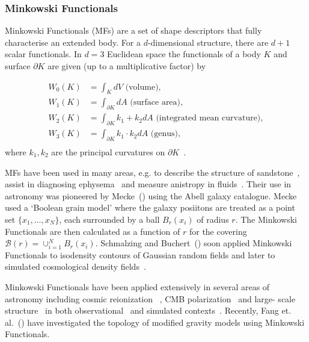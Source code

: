 \documentclass[a4paper,fleqn,usenatbib]{mnras}
\begin{document}
\subsubsection{Minkowski Functionals}

Minkowski Functionals (MFs) are a set of shape descriptors that fully characterise an extended body. For a $d$-dimensional structure, there are $d+1$ scalar functionals. In $d=3$ Euclidean space the functionals of a body $K$ and surface $\partial K$  are given (up to a multiplicative factor) by 

\begin{align}
W_0(K) &= \int_K dV \, \, \text{(volume)}, \\
W_1(K) &= \int_{\partial K} dA \, \, \text{(surface area)}, \\
W_2(K) &= \int_{\partial K} k_1 + k_2 dA \, \, \text{(integrated mean curvature)},\\
W_3(K) &= \int_{\partial K} k_1 \cdot k_2 dA \, \, \text{(genus)}, \\
\end{align}
where $k_1,k_2$ are the principal curvatures on $\partial K$~\citep{2013NJPh...15h3028S}.

MFs have been used in many areas, e.g. to describe the structure of sandstone~\citep{2002Hilfer}, assist in diagnosing ephysema~\citep{2012SPIE.8314E..4YL} and measure anistropy in fluids~\citep{2010JSMTE..11..010K}. Their use in astronomy was pioneered by Mecke~(\citeyear{1994A&A...288..697M}) using the Abell galaxy catalogue. Mecke used a `Boolean grain model' where the galaxy posiitons are treated as a point set $\{x_1,\dots,x_N\}$, each surrounded by a ball $B_r(x_i)$ of radius $r$. The Minkowski Functionals are then calculated as a function of $r$ for the covering $\mathscr{B}(r) = \cup^N_{i=1} B_r(x_i)$. Schmalzing and Buchert~(\citeyear{1997ApJ...482L...1S}) soon applied Minkowski Functionals to isodensity contours of Gaussian random fields and later to simulated cosmological density fields~\citep{1999ApJ...526..568S}.

Minkowski Functionals have been applied extensively in several areas of astronomy including cosmic reionization~ \citep{2006MNRAS.370.1329G}, CMB polarization~\citep{2017arXiv170504454C} and large- scale structure~\citep{2013MNRAS.435..531C} in both observational~\citep{2014MNRAS.443..241W} and simulated contexts~\citep{2017ApJ...836...45A}. Recently, Fang et. al.~(\citeyear{2017PhRvL.118r1301F}) have investigated the topology of modified gravity models using Minkowski Functionals.
\end{document}
